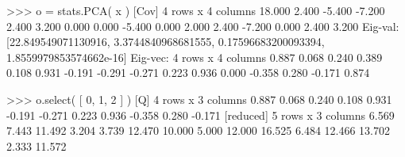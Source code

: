 \begin{pyglist}[language=python,fvset={frame=single}]
>>> o = stats.PCA( x )
[Cov]
4 rows x 4 columns
  18.000    2.400   -5.400   -7.200 
   2.400    3.200    0.000    0.000 
  -5.400    0.000    2.000    2.400 
  -7.200    0.000    2.400    3.200 
Eig-val:  [22.849549071130916, 3.3744840968681555, 0.17596683200093394, 1.8559979853574662e-16]
Eig-vec:
4 rows x 4 columns
   0.887    0.068    0.240    0.389 
   0.108    0.931   -0.191   -0.291 
  -0.271    0.223    0.936    0.000 
  -0.358    0.280   -0.171    0.874 

>>> o.select( [ 0, 1, 2 ] )
[Q]
4 rows x 3 columns
   0.887    0.068    0.240 
   0.108    0.931   -0.191 
  -0.271    0.223    0.936 
  -0.358    0.280   -0.171 
[reduced]
5 rows x 3 columns
   6.569    7.443   11.492 
   3.204    3.739   12.470 
  10.000    5.000   12.000 
  16.525    6.484   12.466 
  13.702    2.333   11.572 
\end{pyglist}
